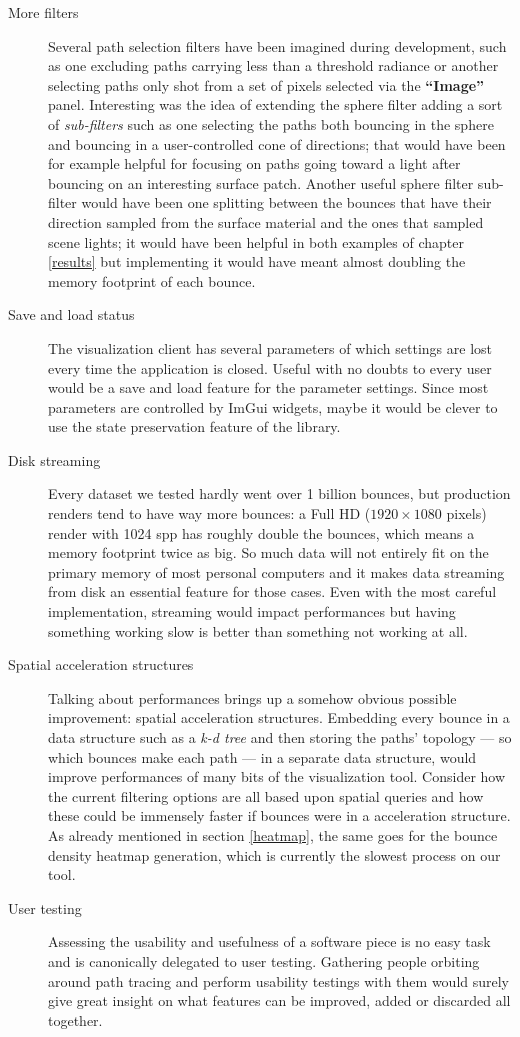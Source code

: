 \begin{description}
	\item[More filters] Several path selection filters have been imagined during development, such as one excluding paths carrying less than a threshold radiance or another selecting paths only shot from a set of pixels selected via the \textbf{“Image”} panel. Interesting was the idea of extending the sphere filter adding a sort of \textit{sub-filters} such as one selecting the paths both bouncing in the sphere and bouncing in a user-controlled cone of directions; that would have been for example helpful for focusing on paths going toward a light after bouncing on an interesting surface patch. Another useful sphere filter sub-filter would have been one splitting between the bounces that have their direction sampled from the surface material and the ones that sampled scene lights; it would have been helpful in both examples of chapter \ref{results} but implementing it would have meant almost doubling the memory footprint of each bounce. 
	\item[Save and load status] The visualization client has several parameters of which settings are lost every time the application is closed. Useful with no doubts to every user would be a save and load feature for the parameter settings. Since most parameters are controlled by ImGui widgets, maybe it would be clever to use the state preservation feature of the library.
	\item[Disk streaming] Every dataset we tested hardly went over 1 billion bounces, but production renders tend to have way more bounces: a Full HD ($1920 \times 1080$ pixels) render with 1024 spp has roughly double the bounces, which means a memory footprint twice as big. So much data will not entirely fit on the primary memory of most personal computers and it makes data streaming from disk an essential feature for those cases. Even with the most careful implementation, streaming would impact performances but having something working slow is better than something not working at all. 
	\item[Spatial acceleration structures] Talking about performances brings up a somehow obvious possible improvement: spatial acceleration structures. Embedding every bounce in a data structure such as a \textit{k-d tree} \cite{bentley1975multidimensional} and then storing the paths' topology --- so which bounces make each path --- in a separate data structure, would improve performances of many bits of the visualization tool. Consider how the current filtering options are all based upon spatial queries and how these could be immensely faster if bounces were in a acceleration structure. As already mentioned in section \ref{heatmap}, the same goes for the bounce density heatmap generation, which is currently the slowest process on our tool.
	\item[User testing] Assessing the usability and usefulness of a software piece is no easy task and is canonically delegated to user testing. Gathering people orbiting around path tracing and perform usability testings with them would surely give great insight on what features can be improved, added or discarded all together. 
\end{description}